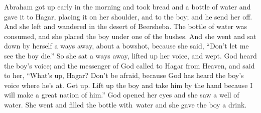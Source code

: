 \begin{inparaenum}
     Abraham got up early in the morning and took bread and a bottle of water and gave it to Hagar, placing it on her shoulder, and to the boy; and he send her off. And she left and wandered in the desert of Beersheba.%
     The bottle of water was consumed, and she placed the boy under one of the bushes.%
     And she went and sat down by herself a ways away, about a bowshot, because she said, ``Don't let me see the boy die.'' So she sat a ways away, lifted up her voice, and wept.%
     God heard the boy's voice; and the messenger of God called to Hagar from Heaven, and said to her, ``What's up, Hagar? Don't be afraid, because God has heard the boy's voice where he's at.%
     Get up. Lift up the boy and take him by the hand because I will make a great nation of him.''%
     God opened her eyes and she saw a well of water. She went and filled the bottle with\understood\ water and she gave the boy a drink.%
    
\end{inparaenum}
